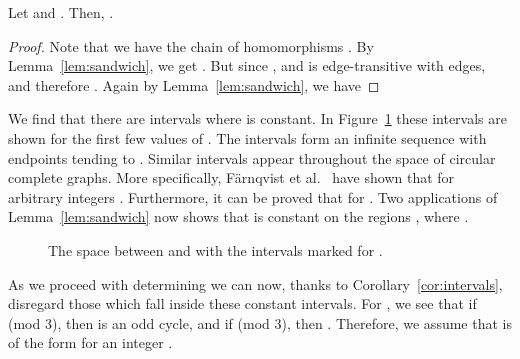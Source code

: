 \documentclass[11pt,a4paper]{article}
\begin{document}
\begin{corollary}
\label{cor:intervals}
Let  and .
Then, .
\end{corollary}
\begin{proof}
  Note that we have the chain of homomorphisms
  .
  By Lemma~\ref{lem:sandwich}, we get . But since , and  is edge-transitive with  edges,  and therefore . 
  Again by Lemma~\ref{lem:sandwich}, we have
  
\end{proof}

We find that there are intervals  where  is constant.
In Figure~\ref{fig:interval} these intervals are shown for the first few values of . The intervals  form an infinite sequence with endpoints tending to . 
Similar intervals appear throughout the space of circular complete graphs.
More specifically,  F\"{a}rnqvist et al.~\cite{farnqvist:etal:09} have shown
that  for arbitrary integers .
Furthermore, it can be proved that  for .
Two applications of Lemma~\ref{lem:sandwich} now shows that  is 
constant on the regions , where
  .

\begin{figure}[h]
\centering
{}
\caption{The space between  and  with the intervals  marked for .}\label{fig:interval}
\end{figure}

As we proceed with determining  we can now, 
thanks to Corollary~\ref{cor:intervals}, disregard those  which fall
inside these constant intervals.
For , we see that if
 (mod 3), then  is an odd cycle,
and if  (mod 3), then .
Therefore, we assume that  is of the form 
 for an integer .
\end{document}

